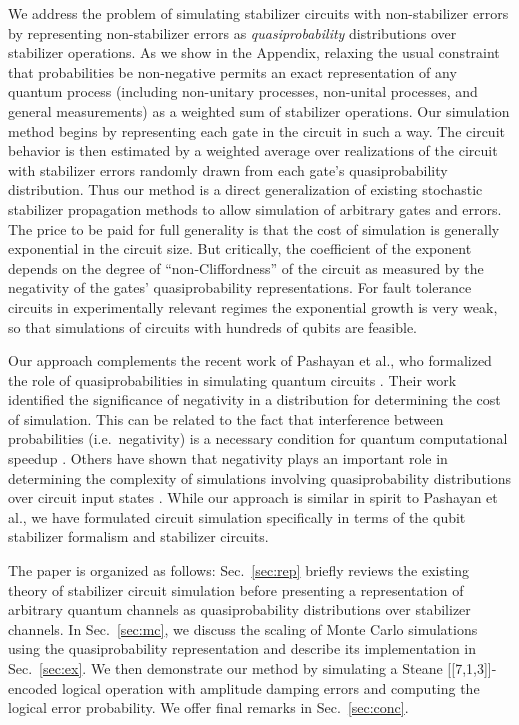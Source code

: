 \documentclass[twocolumn,pra]{revtex4}
\begin{document}
\par
We address the problem of simulating stabilizer circuits with non-stabilizer errors by representing non-stabilizer errors as \emph{quasiprobability} distributions over stabilizer operations. As we show in the Appendix, relaxing the usual constraint that probabilities be non-negative permits an exact representation of any quantum process (including non-unitary processes, non-unital processes, and general measurements) as a weighted sum of stabilizer operations. Our simulation method begins by representing each gate in the circuit in such a way. The circuit behavior is then estimated by a weighted average over realizations of the circuit with stabilizer errors randomly drawn from each gate's quasiprobability distribution. Thus our method is a direct generalization of existing stochastic stabilizer propagation methods to allow simulation of arbitrary gates and errors. The price to be paid for full generality is that the cost of simulation is generally exponential in the circuit size. But critically, the coefficient of the exponent depends on the degree of ``non-Cliffordness'' of the circuit as measured by the negativity of the gates' quasiprobability representations. For fault tolerance circuits in experimentally relevant regimes the exponential growth is very weak, so that simulations of circuits with hundreds of qubits are feasible.  
\par
Our approach complements the recent work of Pashayan et al., who formalized the role of quasiprobabilities in simulating quantum circuits \cite{Pashayan2015}. Their work identified the significance of negativity in a distribution for determining the cost of simulation. This can be related to the fact that interference between probabilities (i.e.\ negativity) is a necessary condition for quantum computational speedup \cite{Stahlke2014}. Others have shown that negativity plays an important role in determining the complexity of simulations involving quasiprobability distributions over circuit input states \cite{1367-2630-14-11-113011}. While our approach is similar in spirit to Pashayan et al., we have formulated circuit simulation specifically in terms of the qubit stabilizer formalism and stabilizer circuits.
\par
The paper is organized as follows: Sec.~\ref{sec:rep} briefly reviews the existing theory of stabilizer circuit simulation before presenting a representation of arbitrary quantum channels as quasiprobability distributions over stabilizer channels. In Sec.~\ref{sec:mc}, we discuss the scaling of Monte Carlo simulations using the quasiprobability representation and describe its implementation in Sec.~\ref{sec:ex}. We then demonstrate our method by simulating a Steane [[7,1,3]]-encoded logical operation with amplitude damping errors and computing the logical error probability. We offer final remarks in Sec.~\ref{sec:conc}.
\end{document}
